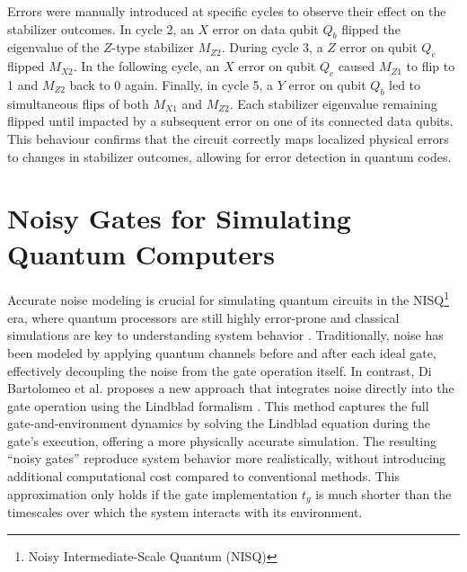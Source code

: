 \documentclass[9pt,a4paper,twocolumn,twoside]{tau-class/tau}
\begin{document}
 Errors were manually introduced at specific cycles to observe their effect on the stabilizer outcomes. In cycle 2, an \(X\) error on data qubit $Q_b$ flipped the eigenvalue of the \(Z\)-type stabilizer \(M_{Z2}\). During cycle 3, a \(Z\) error on qubit $Q_e$ flipped \(M_{X2}\). In the following cycle, an \(X\) error on qubit $Q_c$ caused \(M_{Z1}\) to flip to 1 and \(M_{Z2}\) back to 0 again. Finally, in cycle 5, a \(Y\) error on qubit $Q_b$ led to simultaneous flips of both \(M_{X1}\) and \(M_{Z2}\). Each stabilizer eigenvalue remaining flipped until impacted by a subsequent error on one of its connected data qubits. This behaviour confirms that the circuit correctly maps localized physical errors to changes in stabilizer outcomes, allowing for error detection in quantum codes.


\section{Noisy Gates for Simulating Quantum Computers} 
Accurate noise modeling is crucial for simulating quantum circuits in the NISQ\footnote{Noisy Intermediate-Scale Quantum (NISQ)} era, where quantum processors are still highly error-prone and classical simulations are key to understanding system behavior \cite{dibartolomeo2023noisy}. Traditionally, noise has been modeled by applying quantum channels before and after each ideal gate, effectively decoupling the noise from the gate operation itself. In contrast, Di Bartolomeo et al. proposes a new approach that integrates noise directly into the gate operation using the Lindblad formalism \cite{dibartolomeo2023noisy}. This method captures the full gate-and-environment dynamics by solving the Lindblad equation during the gate's execution, offering a more physically accurate simulation. The resulting “noisy gates” reproduce system behavior more realistically, without introducing additional computational cost compared to conventional methods.
This approximation only holds if the gate implementation $t_g$ is much shorter than the timescales over which the system interacts with its environment.
\end{document}
